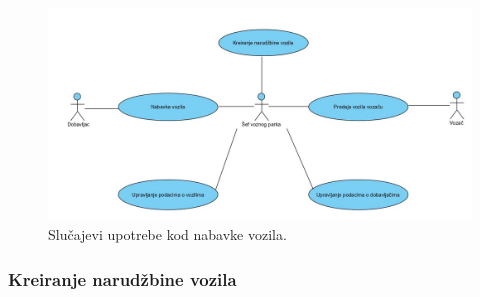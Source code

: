 \begin{figure}[H]
\begin{center}
\includegraphics[width=\textwidth]{Slike/UseCaseZaVozniPark.jpg}
\end{center}
    \caption{Slučajevi upotrebe kod nabavke vozila.}
\label{fig:contextDiagram}
\end{figure}


\subsubsection{\bfseries Kreiranje narudžbine vozila}

